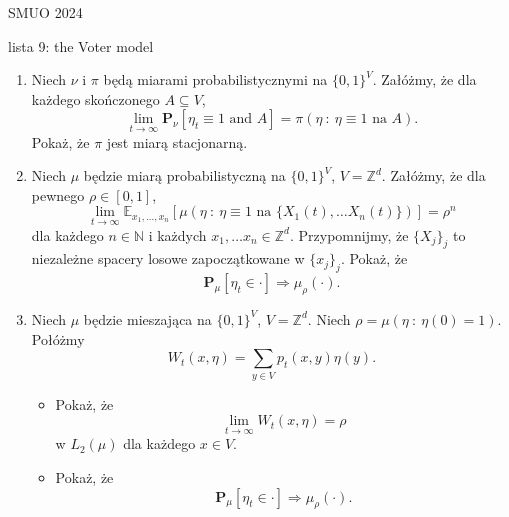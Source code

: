 \documentclass{article}
\begin{document}
SMUO 2024

lista 9: the Voter model

\begin{enumerate}
	\item Niech $\nu$ i $\pi$ będą miarami probabilistycznymi na $\{0,1\}^V$.
		Załóżmy, że dla każdego skończonego $A \subseteq V$,
		\begin{equation*}
			\lim_{t \to \infty} \mathbf{P}_{\nu} [\eta_t \equiv 1 \mbox{ and $A$}] = 
			\pi(\eta \: : \: \eta\equiv 1 \mbox{ na $A$}).
		\end{equation*}
		Pokaż, że $\pi$ jest miarą stacjonarną.

	\item Niech $\mu$ będzie miarą probabilistyczną na $\{0,1\}^V$, $V = \mathbb{Z}^d$. 
		Załóżmy, że dla pewnego $\rho \in [0,1]$, 
		\begin{equation*}
		\lim_{t \to \infty}
		\mathbb{E}_{x_1, \ldots, x_n}[\mu (\eta \: : \: \eta\equiv 1 \mbox{ na } \{X_1(t), \ldots X_n(t) \})]
			=\rho^n
		\end{equation*}
		dla każdego $n \in \mathbb{N}$ i każdych $x_1, \ldots x_n \in \mathbb{Z}^d$. 
		Przypomnijmy, że $\{X_j\}_j$ to niezależne spacery losowe zapoczątkowane w $\{x_j\}_j$.
		Pokaż, że
		\begin{equation*}
			\mathbf{P}_{\mu}[\eta_t \in \cdot] \Rightarrow \mu_\rho(\cdot).
		\end{equation*}

	\item Niech $\mu$ będzie mieszająca na $\{0,1\}^V$, $V = \mathbb{Z}^d$. Niech 
	$\rho = \mu( \eta \: : \: \eta(0)=1)$.
	Połóżmy
	\begin{equation*}
		W_t(x,\eta) = \sum_{y \in V} p_t(x,y) \eta(y).
	\end{equation*}
	\begin{itemize}
		\item Pokaż, że 
			\begin{equation*}
				\lim_{t \to \infty} W_t(x,\eta) = \rho
			\end{equation*}
			w $L_2(\mu)$ dla każdego $x \in V$.
		\item Pokaż, że 
			\begin{equation*}
				\mathbf{P}_\mu[\eta_t \in \cdot] \Rightarrow \mu_\rho(\cdot).
			\end{equation*}
	\end{itemize}


\end{enumerate}
\end{document}
